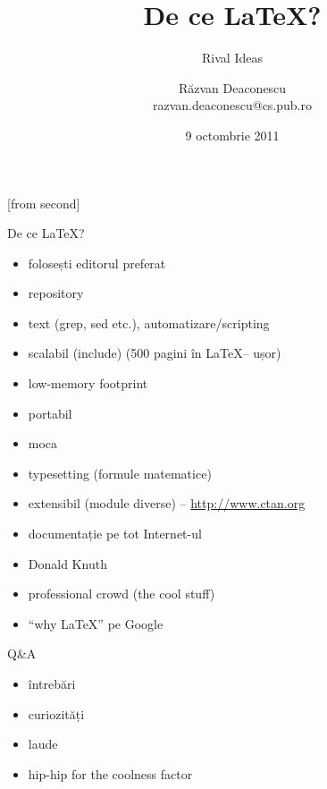\documentclass{simple}
\title[\LaTeX]{De ce \LaTeX?}
\subtitle{Rival Ideas}
\institute{ROSEdu/ACS}
\author[Răzvan Deaconescu]{Răzvan Deaconescu\\
      razvan.deaconescu@cs.pub.ro}
\date{9 octombrie 2011}
\begin{document}
[from second]

\frame{\titlepage}

\begin{frame}{De ce \LaTeX?}
  \begin{itemize}
    \pause \item folosești editorul preferat
    \pause \item repository
    \pause \item text (grep, sed etc.), automatizare/scripting
    \pause \item scalabil (include) (500 pagini în \LaTeX -- ușor)
    \pause \item low-memory footprint
    \pause \item portabil
    \pause \item moca
    \pause \item typesetting (formule matematice)
    \pause \item extensibil (module diverse) -- \url{http://www.ctan.org}
    \pause \item documentație pe tot Internet-ul
    \pause \item Donald Knuth
    \pause \item professional crowd (the cool stuff)
    \pause \item ``why \LaTeX'' pe Google
  \end{itemize}
\end{frame}

\begin{frame}{Q\&A}
  \begin{itemize}
    \item întrebări
    \item curiozități
    \item laude
    \item hip-hip for the coolness factor
  \end{itemize}
\end{frame}
\end{document}
